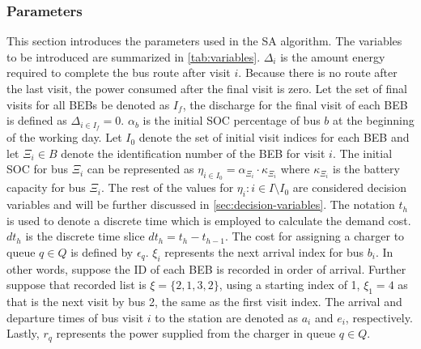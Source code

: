 \documentclass[11pt,a4paper,final]{article}
\newcommand{\Isetinit}{I_0}                 %
\newcommand{\Isetfinal}{I_f}                %
\begin{document}
\subsubsection{Parameters}
\label{sec:input-variables}
This section introduces the parameters used in the SA algorithm. The variables to be introduced are summarized in
\ref{tab:variables}. \(\Delta_i\) is the amount energy required to complete the bus route after visit \(i\). Because there is no route
after the last visit, the power consumed after the final visit is zero. Let the set of final visits for all BEBs be
denoted as \(\Isetfinal\), the discharge for the final visit of each BEB is defined as \(\Delta_{i \in \Isetfinal} = 0\). \(\alpha_b\) is
the initial SOC percentage of bus \(b\) at the beginning of the working day. Let \(\Isetinit\) denote the set of initial
visit indices for each BEB and let \(\Xi_i \in B\) denote the identification number of the BEB for visit \(i\). The initial SOC
for bus \(\Xi_i\) can be represented as \(\eta_{i \in \Isetinit} = \alpha_{\Xi_i} \cdot \kappa_{\Xi_i}\) where \(\kappa_{\Xi_i}\) is the battery capacity for
bus \(\Xi_i\). The rest of the values for \(\eta_i : i \in I \setminus \Isetinit\) are considered decision variables and will be further
discussed in \ref{sec:decision-variables}. The notation \(t_h\) is used to denote a discrete time which is employed to
calculate the demand cost. \(dt_h\) is the discrete time slice \(dt_h = t_h - t_{h-1}\). The cost for assigning a charger to
queue \(q \in Q\) is defined by \(\epsilon_q\). \(\xi_i\) represents the next arrival index for bus \(b_i\). In other words, suppose the ID
of each BEB is recorded in order of arrival. Further suppose that recorded list is \(\xi = \{ 2,1,3,2 \}\), using a starting
index of 1, \(\xi_1 = 4\) as that is the next visit by bus 2, the same as the first visit index. The arrival and departure
times of bus visit \(i\) to the station are denoted as \(a_i\) and \(e_i\), respectively. Lastly, \(r_q\) represents the power
supplied from the charger in queue \(q \in Q\).
\end{document}
